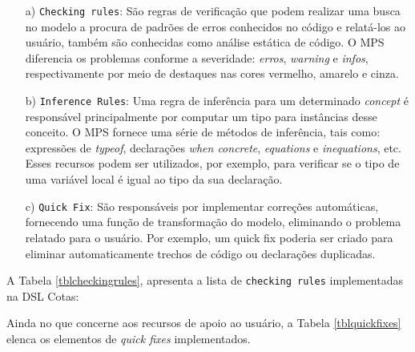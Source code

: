 \begin{enumerate}
 
 \item[a)] \texttt{Checking rules}: São regras de verificação que podem realizar uma busca no modelo a procura de padrões de erros conhecidos no código e relatá-los ao usuário, também são conhecidas como análise estática de código. O \gls{MPS} diferencia os problemas conforme a severidade: \textit{erros}, \textit{warning} e \textit{infos}, respectivamente por meio de destaques nas cores vermelho, amarelo e cinza.
 
 \item[b)]\texttt{Inference Rules}: Uma regra de inferência para um determinado \textit{concept} é responsável principalmente por computar um tipo para instâncias desse conceito. O \gls{MPS} fornece uma série de métodos de inferência, tais como: expressões de \textit{typeof}, declarações \textit{when concrete}, \textit{equations} e \textit{inequations}, etc. Esses recursos podem ser utilizados, por exemplo, para verificar se o tipo de uma variável local é igual ao tipo da sua declaração.
 
 \item[c)]\texttt{Quick Fix}: São responsáveis por implementar correções automáticas, fornecendo uma função de transformação do modelo, eliminando o problema relatado para o usuário. Por exemplo, um quick fix poderia ser criado para eliminar automaticamente trechos de código ou declarações duplicadas.
\end{enumerate}


A Tabela \ref{tblcheckingrules}, apresenta a lista de \texttt{checking rules} implementadas na DSL Cotas:



Ainda no que concerne aos recursos de apoio ao usuário, a Tabela \ref{tblquickfixes} elenca os elementos de \textit{quick fixes} implementados.

